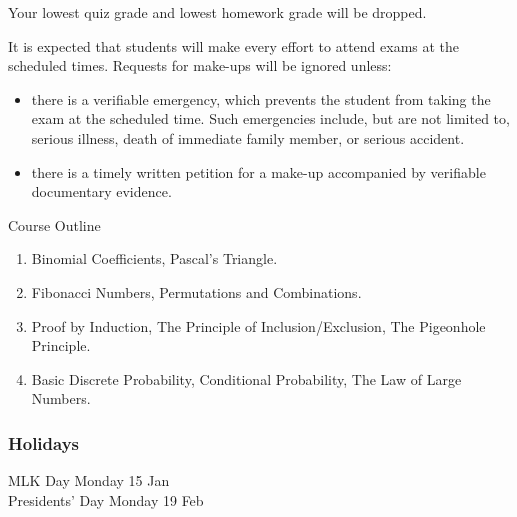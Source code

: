 \documentclass[11pt]{article}
\begin{document}
Your lowest quiz grade and lowest homework grade will be dropped.

It is expected that students will make every effort to attend exams at the scheduled times. Requests for make-ups will be ignored unless:
\begin{itemize}
\item
there is a verifiable emergency, which prevents the student from taking the exam at the scheduled time. Such emergencies include, but are not limited to, serious illness, death of immediate family member, or serious accident.
\item
there is a timely written petition for a make-up accompanied by verifiable documentary evidence.
\end{itemize}

\vspace{5 mm}


{\Large \centerline{Course Outline}}
\begin{enumerate}
\item Binomial Coefficients, Pascal's Triangle.
\item Fibonacci Numbers, Permutations and Combinations.
\item Proof by Induction, The Principle of Inclusion/Exclusion, The Pigeonhole Principle.
\item Basic Discrete Probability, Conditional Probability, The Law of Large Numbers.
\end{enumerate}

\subsubsection*{Holidays}
MLK Day Monday 15 Jan \\
Presidents' Day Monday 19 Feb 
\end{document}
